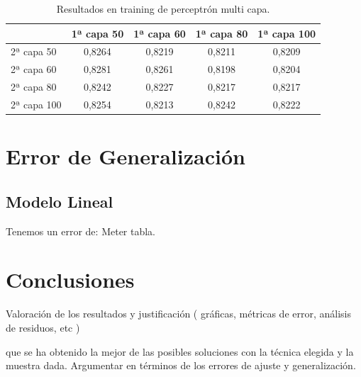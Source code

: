 \documentclass[11pt,a4paper]{article}
\begin{document}
\begin{table}[h]
\begin{center}
\begin{tabular}{|l|c|c|c|c|}
\hline

  & 1ª capa 50 & 1ª capa 60 & 1ª capa 80 & 1ª capa 100 \\ \hline
  2ª capa 50 & 0,8264 & 0,8219 & 0,8211 & 0,8209\\
  2ª capa 60 & 0,8281 & 0,8261 & 0,8198 & 0,8204\\
  2ª capa 80 & 0,8242 & 0,8227 & 0,8217 & 0,8217\\
  2ª capa 100 & 0,8254 & 0,8213 & 0,8242 & 0,8222\\\hline
\end{tabular}
\caption{Resultados en training de perceptrón multi capa.}

\end{center}
\end{table}


\section{ Error de Generalización}
\subsection{Modelo Lineal}

Tenemos un error de: Meter tabla.


\section{ Conclusiones }
Valoración de los resultados y justificación
( gráficas, métricas de error, análisis de residuos, etc )


que se ha obtenido la mejor de las posibles soluciones con la técnica elegida y la muestra dada. Argumentar en términos de los errores de ajuste y generalización. 
\end{document}
